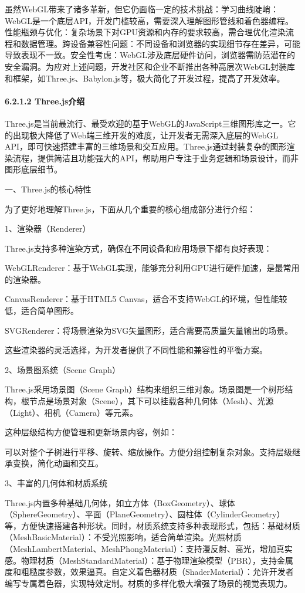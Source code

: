 虽然WebGL带来了诸多革新，但它仍面临一定的技术挑战：学习曲线陡峭：WebGL是一个底层API，开发门槛较高，需要深入理解图形管线和着色器编程。性能瓶颈与优化：复杂场景下对GPU资源和内存的要求较高，需合理优化渲染流程和数据管理。跨设备兼容性问题：不同设备和浏览器的实现细节存在差异，可能导致表现不一致。安全性考虑：WebGL涉及底层硬件访问，浏览器需防范潜在的安全漏洞。为应对上述问题，开发社区和企业不断推出各种高层次WebGL封装库和框架，如Three.js、Babylon.js等，极大简化了开发过程，提高了开发效率。

\paragraph{6.2.1.2 Three.js介绍}\label{three.jsux4ecbux7ecd}

Three.js是当前最流行、最受欢迎的基于WebGL的JavaScript三维图形库之一。它的出现极大降低了Web端三维开发的难度，让开发者无需深入底层的WebGL API，即可快速搭建丰富的三维场景和交互应用。Three.js通过封装复杂的图形渲染流程，提供简洁且功能强大的API，帮助用户专注于业务逻辑和场景设计，而非图形底层细节。

一、Three.js的核心特性

为了更好地理解Three.js，下面从几个重要的核心组成部分进行介绍：

1、渲染器（Renderer）

Three.js支持多种渲染方式，确保在不同设备和应用场景下都有良好表现：

WebGLRenderer：基于WebGL实现，能够充分利用GPU进行硬件加速，是最常用的渲染器。

CanvasRenderer：基于HTML5 Canvas，适合不支持WebGL的环境，但性能较低，适合简单图形。

SVGRenderer：将场景渲染为SVG矢量图形，适合需要高质量矢量输出的场景。

这些渲染器的灵活选择，为开发者提供了不同性能和兼容性的平衡方案。

2、场景图系统（Scene Graph）

Three.js采用场景图（Scene Graph）结构来组织三维对象。场景图是一个树形结构，根节点是场景对象（Scene），其下可以挂载各种几何体（Mesh）、光源（Light）、相机（Camera）等元素。

这种层级结构方便管理和更新场景内容，例如：

可以对整个子树进行平移、旋转、缩放操作。方便分组控制复杂对象。支持层级继承变换，简化动画和交互。

3、丰富的几何体和材质系统

Three.js内置多种基础几何体，如立方体（BoxGeometry）、球体（SphereGeometry）、平面（PlaneGeometry）、圆柱体（CylinderGeometry）等，方便快速搭建各种形状。同时，材质系统支持多种表现形式，包括：基础材质（MeshBasicMaterial）：不受光照影响，适合简单渲染。光照材质（MeshLambertMaterial、MeshPhongMaterial）：支持漫反射、高光，增加真实感。物理材质（MeshStandardMaterial）：基于物理渲染模型（PBR），支持金属度和粗糙度参数，效果逼真。自定义着色器材质（ShaderMaterial）：允许开发者编写专属着色器，实现特效定制。材质的多样化极大增强了场景的视觉表现力。

